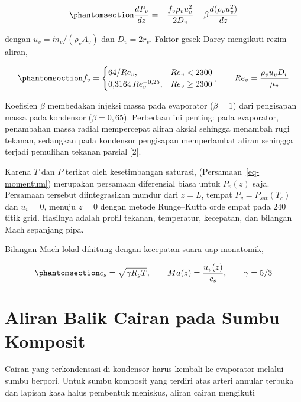 \documentclass[
  indonesian,
  12pt,
  a4paper,
]{report}
\begin{document}
\begin{equation}\protect\phantomsection\label{eq-momentum}{\frac{dP_v}{dz} = -\frac{f_v \rho_v u_v^{2}}{2 D_v} - \beta \frac{d(\rho_v u_v^{2})}{dz}}\end{equation}

dengan \(u_v = \dot m_v/(\rho_v A_v)\) dan \(D_v = 2 r_v\). Faktor gesek
Darcy mengikuti rezim aliran,

\begin{equation}\protect\phantomsection\label{eq-fv}{f_v = \begin{cases} 64/Re_v, & Re_v < 2300 \\ 0{,}3164\,Re_v^{-0{,}25}, & Re_v \ge 2300 \end{cases}, \qquad Re_v = \frac{\rho_v u_v D_v}{\mu_v}}\end{equation}

Koefisien \(\beta\) membedakan injeksi massa pada evaporator
(\(\beta = 1\)) dari pengisapan massa pada kondensor
(\(\beta = 0{,}65\)). Perbedaan ini penting: pada evaporator, penambahan
massa radial mempercepat aliran aksial sehingga menambah rugi tekanan,
sedangkan pada kondensor pengisapan memperlambat aliran sehingga terjadi
pemulihan tekanan parsial {[}2{]}.

Karena \(T\) dan \(P\) terikat oleh kesetimbangan saturasi,
(Persamaan~\ref{eq-momentum}) merupakan persamaan diferensial biasa
untuk \(P_v(z)\) saja. Persamaan tersebut diintegrasikan mundur dari
\(z = L\), tempat \(P_v = P_{sat}(T_c)\) dan \(u_v = 0\), menuju
\(z = 0\) dengan metode Runge--Kutta orde empat pada 240 titik grid.
Hasilnya adalah profil tekanan, temperatur, kecepatan, dan bilangan Mach
sepanjang pipa.

Bilangan Mach lokal dihitung dengan kecepatan suara uap monatomik,

\begin{equation}\protect\phantomsection\label{eq-mach}{c_s = \sqrt{\gamma R_g T}, \qquad Ma(z) = \frac{u_v(z)}{c_s}, \qquad \gamma = 5/3}\end{equation}

\section{Aliran Balik Cairan pada Sumbu
Komposit}\label{aliran-balik-cairan-pada-sumbu-komposit}

Cairan yang terkondensasi di kondensor harus kembali ke evaporator
melalui sumbu berpori. Untuk sumbu komposit yang terdiri atas arteri
annular terbuka dan lapisan kasa halus pembentuk meniskus, aliran cairan
mengikuti
\end{document}
